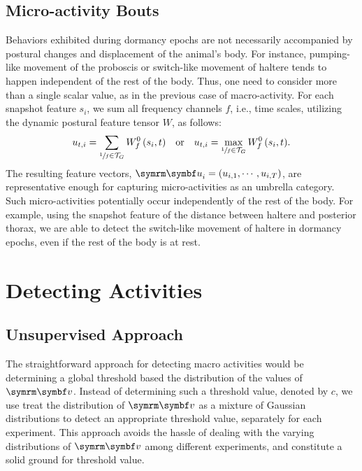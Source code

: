 \subsection{Micro-activity Bouts}
Behaviors exhibited during dormancy epochs are not necessarily accompanied by postural changes and displacement of the animal's body.
For instance, pumping-like movement of the proboscis or switch-like movement of haltere tends to happen independent of the rest of the body.
Thus, one need to consider more than a single scalar value, as in the previous case of macro-activity.
For each snapshot feature $s_i$, we sum all frequency channels $f$, i.e., time scales, utilizing the dynamic postural feature tensor $W$, as follows:
\begin{equation}
	u_{t,i} = \sum_{\sfrac{1}{f} \in \mathcal{T}_G}{W_f^0\left(s_i,t\right)} \quad \textnormal{or} \quad
	u_{t,i} = \max_{\sfrac{1}{f} \in \mathcal{T}_G}{W_f^0\left(s_i,t\right)}.
\end{equation}
The resulting feature vectors, $\V{u}_i=\rbr{u_{i,1}, \cdots, u_{i,T}}$, are representative enough for capturing micro-activities as an umbrella category.
Such micro-activities potentially occur independently of the rest of the body.
For example, using the snapshot feature of the distance between haltere and posterior thorax, we are able to detect the switch-like movement of haltere in dormancy epochs, even if the rest of the body is at rest.

\section{Detecting Activities}
\subsection{Unsupervised Approach}
The straightforward approach for detecting macro activities would be determining a global threshold based the distribution of the values of $\V{v}$.
Instead of determining such a threshold value, denoted by $c$, we use treat the distribution of $\V{v}$ as a mixture of Gaussian distributions to detect an appropriate threshold value, separately for each experiment.
This approach avoids the hassle of dealing with the varying distributions of $\V{v}$ among different experiments, and constitute a solid ground for threshold value.

